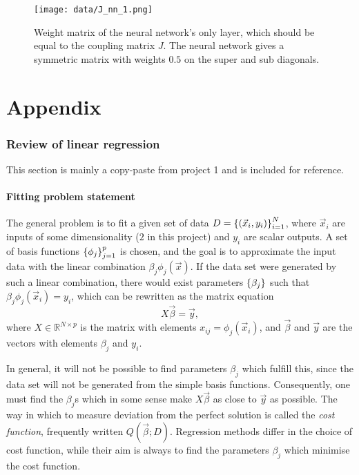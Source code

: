 \documentclass[11pt,british,a4paper]{article}
\numberwithin{equation}{section}
\begin{document}
\begin{figure}[H]
    \centering
    \texttt{[image: data/J\_nn\_1.png]}
    \caption{Weight matrix of the neural network's only layer, which should be equal to the coupling matrix \(J\). The neural network gives a symmetric matrix with weights \(\num{0.5}\) on the super and sub diagonals.}
\end{figure}


\clearpage
\appendix
\part*{Appendix}
\renewcommand{\thesection}{\Alph{section}}

\section{Review of linear regression}\label{sec:linreg}
This section is mainly a copy-paste from project 1 and is included for reference.
\subsection{Fitting problem statement}
The general problem is to fit a given set of data \(D=\qty{(\vec{x}_i,y_i)}_{i=1}^N\), where \(\vec{x}_i\) are inputs of some dimensionality (\(2\) in this project) and \(y_i\) are scalar outputs.
A set of basis functions \(\qty{\phi_j}_{j=1}^p\) is chosen, and the goal is to approximate the input data with the linear combination \(\beta_j \phi_j(\vec{x})\).
If the data set were generated by such a linear combination, there would exist parameters \(\qty{\beta_j}\) such that \(\beta_j\phi_j(\vec{x}_i)=y_i\), which can be rewritten as the matrix equation
\begin{equation}
    X\vec{\beta} = \vec{y},
\end{equation}
where \(X\in\mathbb{R}^{N\times p}\) is the matrix with elements \(x_{ij}=\phi_j(\vec{x}_i)\), and \(\vec{\beta}\) and \(\vec{y}\) are the vectors with elements \(\beta_j\) and \(y_i\).

In general, it will not be possible to find parameters \(\beta_j\) which fulfill this, since the data set will not be generated from the simple basis functions.
Consequently, one must find the \(\beta_j\)s which in some sense make \(X\vec{\beta}\) as close to \(\vec{y}\) as possible.
The way in which to measure deviation from the perfect solution is called the \emph{cost function}, frequently written \(Q(\vec{\beta};D)\).
Regression methods differ in the choice of cost function, while their aim is always to find the parameters \(\beta_j\) which minimise the cost function.
\end{document}
